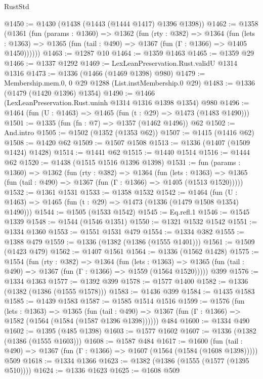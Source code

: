 \begin{lexlean}{RustStd}
\begin{coremodule}
{\begin{coremodule}
{{{{{{{{{{{{{{@1450 := @1430 (@1438 (@1443 (@1444 @1417) @1396 @1398))
@1462 := @1358
    (@1361
      (fun (params : @1360) =>
      @1362
        (fun (rty : @382) =>
        @1364
          (fun (lets : @1363) =>
          @1365 (fun (tail : @490) => @1367 (fun (Γ : @1366) => @1405 @1450))))))
@1463 := @1287 @10
@1464 := @1359 @1463
@1465 := @1359 @29
@1466 := @1337 @1292
@1469 := LexLeanPreservation.Rust.validU @1314 @1316
@1473 := @1336 (@1466 (@1469 @1398) @980)
@1479 := Membership.mem.{0, 0} @29 @1288 (List.instMembership.{0} @29)
@1483 := @1336 (@1479 (@1420 @1396) @1354)
@1490 := @1466 (LexLeanPreservation.Rust.uninh @1314 @1316 @1398 @1354) @980
@1496 := @1464 (fun (U : @1463) => @1465 (fun (t : @29) => @1473 (@1483 @1490)))
@1501 := @1335 (fun (fn : @7) => @1357 (@1462 @1496)) @62
@1502 := And.intro
@1505 := @1502 (@1352 (@1353 @62))
@1507 := @1415 (@1416 @62)
@1508 := @1420 @62
@1509 := @1507 @1508
@1513 := @1336 (@1407 (@1509 @1424) @1428)
@1514 := @1441 @62
@1515 := @1440 @1514
@1516 := @1444 @62
@1520 := @1438 (@1515 @1516 @1396 @1398)
@1531 := fun (params : @1360) =>
  @1362
    (fun (rty : @382) =>
    @1364
      (fun (lets : @1363) =>
      @1365 (fun (tail : @490) => @1367 (fun (Γ : @1366) => @1405 (@1513 @1520)))))
@1532 := @1361 @1531
@1533 := @1358 @1532
@1542 := @1464 (fun (U : @1463) => @1465 (fun (t : @29) => @1473 (@1336 (@1479 @1508 @1354) @1490)))
@1544 := @1505 (@1533 @1542)
@1545 := Eq.refl.{1}
@1546 := @1545 @1339
@1548 := @1544 (@1546 @1351)
@1550 := @1321 @1532 @1542
@1551 := @1334 @1360
@1553 := @1551 @1531 @479
@1554 := @1334 @382
@1555 := @1388 @479
@1559 := @1336 (@1382 (@1386 (@1555 @1401)))
@1561 := @1509 (@1423 @479)
@1562 := @1407 @1561
@1564 := @1336 (@1562 @1428)
@1575 := @1554
    (fun (rty : @382) =>
    @1364
      (fun (lets : @1363) =>
      @1365 (fun (tail : @490) => @1367 (fun (Γ : @1366) => @1559 (@1564 @1520)))))
    @399
@1576 := @1334 @1363
@1577 := @1392 @399
@1578 := @1577 @1400
@1582 := @1336 (@1382 (@1386 (@1555 @1578)))
@1583 := @1436 @399
@1584 := @1435 @1583
@1585 := @1439 @1583
@1587 := @1585 @1514 @1516
@1599 := @1576
    (fun (lets : @1363) =>
    @1365
      (fun (tail : @490) => @1367 (fun (Γ : @1366) => @1582 (@1564 (@1584 (@1587 @1396 @1398))))))
    @484
@1600 := @1334 @490
@1602 := @1395 (@485 @1398)
@1603 := @1577 @1602
@1607 := @1336 (@1382 (@1386 (@1555 @1603)))
@1608 := @1587 @484
@1617 := @1600
    (fun (tail : @490) => @1367 (fun (Γ : @1366) => @1607 (@1564 (@1584 (@1608 @1398)))))
    @509
@1618 := @1334 @1366
@1623 := @1382 (@1386 (@1555 (@1577 (@1395 @510))))
@1624 := @1336 @1623
@1625 := @1608 @509
}}}}}}}}}}}}}}
\end{coremodule}}
\end{coremodule}
\end{lexlean}
